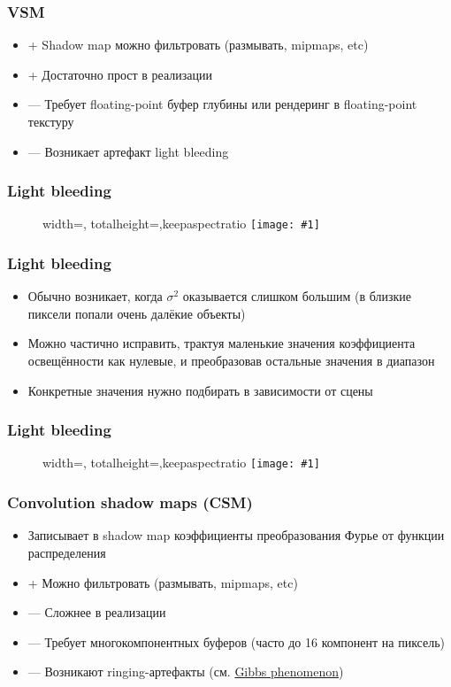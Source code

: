 \documentclass{beamer}
\newcommand{\slideimage}[1]{
  \begin{figure}
    \begin{adjustbox}{width=\textwidth, totalheight=\textheight-2\baselineskip-2\baselineskip,keepaspectratio}
      \texttt{[image: \#1]}
    \end{adjustbox}
  \end{figure}
}
\begin{document}
\begin{frame}[fragile]
\frametitle{VSM}
\begin{itemize}
\item {\color{green}+} Shadow map можно фильтровать (размывать, mipmaps, etc)
\item {\color{green}+} Достаточно прост в реализации
\item {\color{red}—} Требует floating-point буфер глубины или рендеринг в floating-point текстуру
\item {\color{red}—} Возникает артефакт light bleeding
\end{itemize}
\end{frame}

\begin{frame}[fragile]
\frametitle{Light bleeding}
\slideimage{vsm_light_bleeding.png}
\end{frame}

\begin{frame}[fragile]
\frametitle{Light bleeding}
\begin{itemize}
\item Обычно возникает, когда \begin{math}\sigma^2\end{math} оказывается слишком большим (в близкие пиксели попали очень далёкие объекты)
\pause
\item Можно частично исправить, трактуя маленькие значения коэффициента освещённости как нулевые, и преобразовав остальные значения в диапазон \begin{math}[0, 1]\end{math}
\pause
\item Конкретные значения нужно подбирать в зависимости от сцены
\end{itemize}
\end{frame}

\begin{frame}[fragile]
\frametitle{Light bleeding}
\slideimage{light_bleeding_scheme.jpg}
\end{frame}

\begin{frame}[fragile]
\frametitle{Convolution shadow maps (CSM)}
\begin{itemize}
\item Записывает в shadow map коэффициенты преобразования Фурье от функции распределения
\pause
\item {\color{green}+} Можно фильтровать (размывать, mipmaps, etc)
\item {\color{red}—} Сложнее в реализации
\item {\color{red}—} Требует многокомпонентных буферов (часто до 16 компонент на пиксель)
\item {\color{red}—} Возникают ringing-артефакты (см. \href{https://en.wikipedia.org/wiki/Gibbs_phenomenon}{Gibbs phenomenon})
\end{itemize}
\end{frame}
\end{document}
